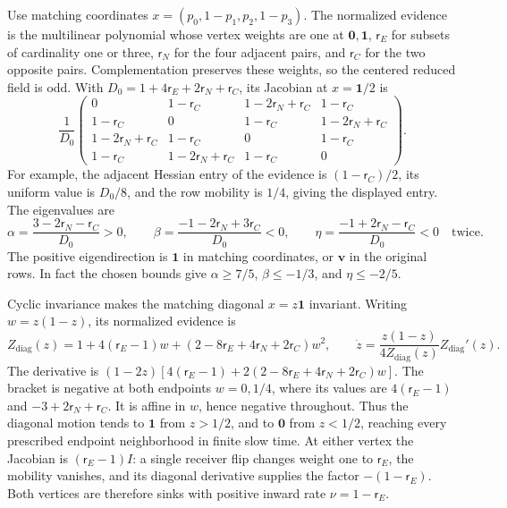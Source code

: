 Use matching coordinates
\(x=(p_0,1-p_1,p_2,1-p_3)\). The normalized evidence is the
multilinear polynomial whose vertex weights are one at \(\mathbf0,\mathbf1\),
\(\mathsf r_E\) for subsets of cardinality one or three, \(\mathsf r_N\) for the four adjacent
pairs, and \(\mathsf r_C\) for the two opposite pairs. Complementation preserves
these weights, so the centered reduced field is odd. With
\(D_0=1+4\mathsf r_E+2\mathsf r_N+\mathsf r_C\), its Jacobian at \(x=\mathbf1/2\) is
\[
 \frac1{D_0}
 \begin{pmatrix}
 0&1-\mathsf r_C&1-2\mathsf r_N+\mathsf r_C&1-\mathsf r_C\\
 1-\mathsf r_C&0&1-\mathsf r_C&1-2\mathsf r_N+\mathsf r_C\\
 1-2\mathsf r_N+\mathsf r_C&1-\mathsf r_C&0&1-\mathsf r_C\\
 1-\mathsf r_C&1-2\mathsf r_N+\mathsf r_C&1-\mathsf r_C&0
 \end{pmatrix}.
\]
For example, the adjacent Hessian entry of the evidence is
\((1-\mathsf r_C)/2\), its uniform value is \(D_0/8\), and the row mobility is
\(1/4\), giving the displayed entry. The eigenvalues are
\begin{equation}
 \alpha=\frac{3-2\mathsf r_N-\mathsf r_C}{D_0}>0,\qquad
 \beta=\frac{-1-2\mathsf r_N+3\mathsf r_C}{D_0}<0,\qquad
 \eta=\frac{-1+2\mathsf r_N-\mathsf r_C}{D_0}<0\quad\text{twice}.
\label{eq:phil-selection-saddle-spectrum}
\end{equation}
The positive eigendirection is \(\mathbf1\) in matching coordinates,
or \(\mathbf v\) in the original rows. In fact the chosen bounds give
\(\alpha\ge7/5\), \(\beta\le-1/3\), and \(\eta\le-2/5\).

Cyclic invariance makes the matching diagonal \(x=z\mathbf1\) invariant.
Writing \(w=z(1-z)\), its normalized evidence is
\[
 Z_{\mathrm{diag}}(z)
 =1+4(\mathsf r_E-1)w+(2-8\mathsf r_E+4\mathsf r_N+2\mathsf r_C)w^2,
 \qquad
 \dot z=\frac{z(1-z)}{4Z_{\mathrm{diag}}(z)}Z_{\mathrm{diag}}'(z).
\]
The derivative is \((1-2z)[4(\mathsf r_E-1)+2(2-8\mathsf r_E+4\mathsf r_N+2\mathsf r_C)w]\).
The bracket is negative at both endpoints \(w=0,1/4\), where its values
are \(4(\mathsf r_E-1)\) and \(-3+2\mathsf r_N+\mathsf r_C\). It is affine in \(w\), hence negative
throughout. Thus the diagonal motion tends to \(\mathbf1\) from
\(z>1/2\), and to \(\mathbf0\) from \(z<1/2\), reaching every prescribed
endpoint neighborhood in finite slow time. At either vertex the Jacobian
is \((\mathsf r_E-1)I\): a single receiver flip changes weight one to \(\mathsf r_E\), the
mobility vanishes, and its diagonal derivative supplies the factor
\(-(1-\mathsf r_E)\). Both vertices are therefore sinks with positive inward rate
\(\nu=1-\mathsf r_E\).


